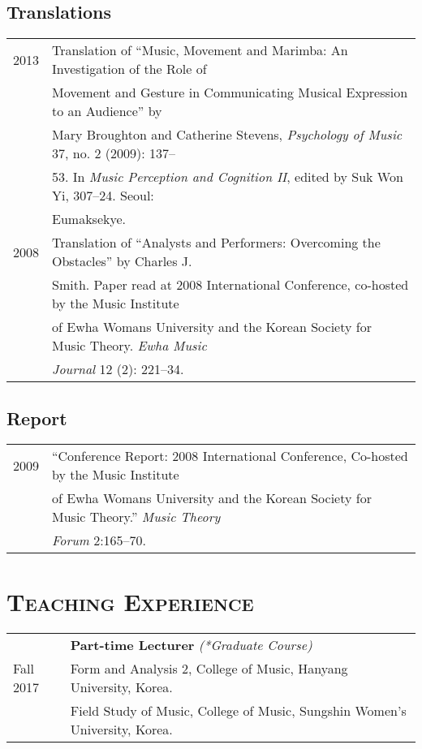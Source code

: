 \documentclass[a4paper,11pt]{article}
\begin{document}
  \subsection*{Translations}
  \hspace*{-0.25cm}
  \begin{tabular}{p{2.5cm} p{12.5cm}}
    2013 & Translation of “Music, Movement and Marimba: An Investigation of the Role of\\
    & Movement and Gesture in Communicating Musical Expression to an Audience” by\\
    & Mary Broughton and Catherine Stevens, \textit{Psychology of Music} 37, no. 2 (2009): 137–\\
    & 53. In \textit{Music Perception and Cognition II}, edited by Suk Won Yi, 307–24. Seoul:\\
    & Eumaksekye.\\[2mm]
    
    2008 & Translation of “Analysts and Performers: Overcoming the Obstacles” by Charles J.\\
    & Smith. Paper read at 2008 International Conference, co-hosted by the Music Institute\\
    & of Ewha Womans University and the Korean Society for Music Theory. \textit{Ewha Music}\\
    & \textit{Journal} 12 (2): 221–34.
  \end{tabular}
  
  \subsection*{Report}
  \hspace*{-0.25cm}
  \begin{tabular}{p{2.5cm} p{12.5cm}}
    2009 & “Conference Report: 2008 International Conference, Co-hosted by the Music Institute\\
    & of Ewha Womans University and the Korean Society for Music Theory.” \textit{Music Theory}\\
    & \textit{Forum} 2:165–70.   
  \end{tabular}
  
  \vspace{5.0mm}
  
  \section*{\textsc{Teaching Experience}}
  
  \hspace*{-0.25cm}
  \begin{tabular}{p{2.5cm} l}
    & \textbf{Part-time Lecturer} \textit{(*Graduate Course)}\\
    Fall 2017 & Form and Analysis 2, College of Music, Hanyang University, Korea.\\
    & Field Study of Music, College of Music, Sungshin Women's University, Korea.\\
  \end{tabular}
  
\end{document}
